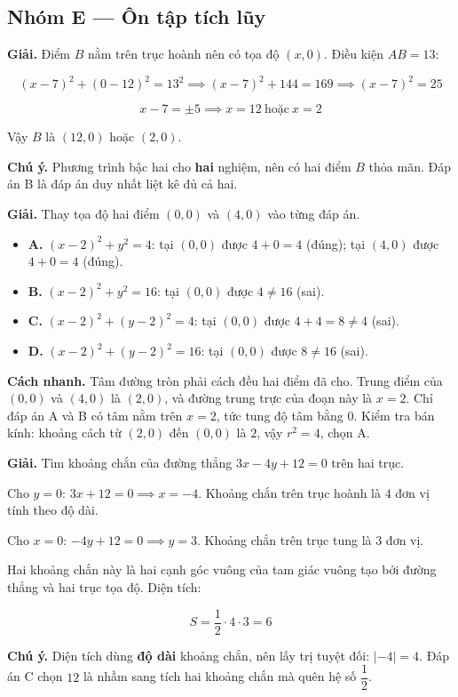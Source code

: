 \documentclass[11pt, a4paper]{article}
\begin{document}
\subsection*{Nhóm E — Ôn tập tích lũy}

\begin{dapan}[1 — Đáp án B]
\textbf{Giải.} Điểm $B$ nằm trên trục hoành nên có tọa độ $(x, 0)$. Điều kiện $AB = 13$:

$$(x - 7)^2 + (0 - 12)^2 = 13^2 \implies (x-7)^2 + 144 = 169 \implies (x-7)^2 = 25$$

$$x - 7 = \pm 5 \implies x = 12 \ \text{hoặc} \ x = 2$$

Vậy $B$ là $(12, 0)$ hoặc $(2, 0)$.

\textbf{Chú ý.} Phương trình bậc hai cho \textbf{hai} nghiệm, nên có hai điểm $B$ thỏa mãn. Đáp án B là đáp án duy nhất liệt kê đủ cả hai.
\end{dapan}

\begin{dapan}[2 — Đáp án A]
\textbf{Giải.} Thay tọa độ hai điểm $(0,0)$ và $(4,0)$ vào từng đáp án.

\begin{itemize}[leftmargin=1.4em, itemsep=2pt]
\item \textbf{A.} $(x-2)^2 + y^2 = 4$: tại $(0,0)$ được $4 + 0 = 4$ (đúng); tại $(4,0)$ được $4 + 0 = 4$ (đúng).
\item \textbf{B.} $(x-2)^2 + y^2 = 16$: tại $(0,0)$ được $4 \ne 16$ (sai).
\item \textbf{C.} $(x-2)^2 + (y-2)^2 = 4$: tại $(0,0)$ được $4 + 4 = 8 \ne 4$ (sai).
\item \textbf{D.} $(x-2)^2 + (y-2)^2 = 16$: tại $(0,0)$ được $8 \ne 16$ (sai).
\end{itemize}


\textbf{Cách nhanh.} Tâm đường tròn phải cách đều hai điểm đã cho. Trung điểm của $(0,0)$ và $(4,0)$ là $(2,0)$, và đường trung trực của đoạn này là $x = 2$. Chỉ đáp án A và B có tâm nằm trên $x = 2$, tức tung độ tâm bằng $0$. Kiểm tra bán kính: khoảng cách từ $(2,0)$ đến $(0,0)$ là $2$, vậy $r^2 = 4$, chọn A.
\end{dapan}

\begin{dapan}[3 — Đáp án B]
\textbf{Giải.} Tìm khoảng chắn của đường thẳng $3x - 4y + 12 = 0$ trên hai trục.

Cho $y = 0$: $3x + 12 = 0 \implies x = -4$. Khoảng chắn trên trục hoành là $4$ đơn vị tính theo độ dài.

Cho $x = 0$: $-4y + 12 = 0 \implies y = 3$. Khoảng chắn trên trục tung là $3$ đơn vị.

Hai khoảng chắn này là hai cạnh góc vuông của tam giác vuông tạo bởi đường thẳng và hai trục tọa độ. Diện tích:

$$S = \frac{1}{2} \cdot 4 \cdot 3 = 6$$

\textbf{Chú ý.} Diện tích dùng \textbf{độ dài} khoảng chắn, nên lấy trị tuyệt đối: $|-4| = 4$. Đáp án C chọn $12$ là nhầm sang tích hai khoảng chắn mà quên hệ số $\dfrac{1}{2}$.
\end{dapan}
\end{document}
